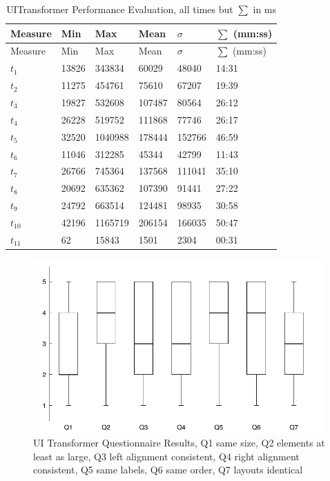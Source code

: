 \hypertarget{tbl:uitransformer.performance}{}
\begin{longtable}[]{@{}llllll@{}}
\caption{\label{tbl:uitransformer.performance}UITransformer Performance Evaluation, all times but \(\sum\) in ms}\tabularnewline
\toprule
Measure & Min & Max & Mean & \(\sigma\) & \(\sum\) (mm:ss)\tabularnewline
\midrule
\endfirsthead
\toprule
Measure & Min & Max & Mean & \(\sigma\) & \(\sum\) (mm:ss)\tabularnewline
\midrule
\endhead
\(t_1\) & 13826 & 343834 & 60029 & 48040 & 14:31\tabularnewline
\(t_2\) & 11275 & 454761 & 75610 & 67207 & 19:39\tabularnewline
\(t_3\) & 19827 & 532608 & 107487 & 80564 & 26:12\tabularnewline
\(t_4\) & 26228 & 519752 & 111868 & 77746 & 26:17\tabularnewline
\(t_5\) & 32520 & 1040988 & 178444 & 152766 & 46:59\tabularnewline
\(t_6\) & 11046 & 312285 & 45344 & 42799 & 11:43\tabularnewline
\(t_7\) & 26766 & 745364 & 137568 & 111041 & 35:10\tabularnewline
\(t_8\) & 20692 & 635362 & 107390 & 91441 & 27:22\tabularnewline
\(t_9\) & 24792 & 663514 & 124481 & 98935 & 30:58\tabularnewline
\(t_{10}\) & 42196 & 1165719 & 206154 & 166035 & 50:47\tabularnewline
\(t_{11}\) & 62 & 15843 & 1501 & 2304 & 00:31\tabularnewline
\bottomrule
\end{longtable}

\begin{figure}
\hypertarget{fig:uitransformer.boxplot}{%
\centering
\includegraphics[width=0.99\textwidth]{../figures/boxplots/uitransformer-boxplot.pdf}
\caption{UI Transformer Questionnaire Results, Q1 same size, Q2 elements at least as large, Q3 left alignment consistent, Q4 right alignment consistent, Q5 same labels, Q6 same order, Q7 layouts identical}\label{fig:uitransformer.boxplot}
}
\end{figure}


